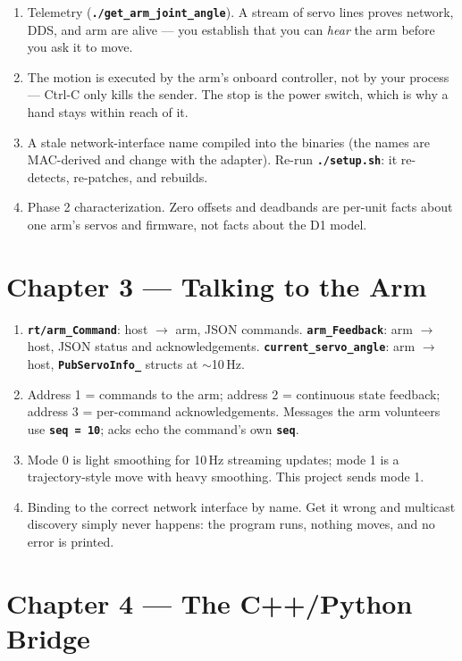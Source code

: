 \documentclass[11pt,twoside,openright]{book}
\newcommand{\code}[1]{\texttt{\bfseries #1}}
\begin{document}
\begin{enumerate}
  \item Telemetry (\code{./get\_arm\_joint\_angle}). A stream of servo
    lines proves network, DDS, and arm are alive --- you establish that
    you can \emph{hear} the arm before you ask it to move.
  \item The motion is executed by the arm's onboard controller, not by
    your process --- Ctrl-C only kills the sender. The stop is the power
    switch, which is why a hand stays within reach of it.
  \item A stale network-interface name compiled into the binaries (the
    names are MAC-derived and change with the adapter). Re-run
    \code{./setup.sh}: it re-detects, re-patches, and rebuilds.
  \item Phase 2 characterization. Zero offsets and deadbands are
    per-unit facts about one arm's servos and firmware, not facts about
    the D1 model.
\end{enumerate}

\section{Chapter 3 --- Talking to the Arm}

\begin{enumerate}
  \item \code{rt/arm\_Command}: host $\rightarrow$ arm, JSON commands.
    \code{arm\_Feedback}: arm $\rightarrow$ host, JSON status and
    acknowledgements. \code{current\_servo\_angle}: arm $\rightarrow$
    host, \code{PubServoInfo\_} structs at $\sim$10\,Hz.
  \item Address 1 = commands to the arm; address 2 = continuous state
    feedback; address 3 = per-command acknowledgements. Messages the arm
    volunteers use \code{seq = 10}; acks echo the command's own
    \code{seq}.
  \item Mode 0 is light smoothing for 10\,Hz streaming updates; mode 1
    is a trajectory-style move with heavy smoothing. This project sends
    mode 1.
  \item Binding to the correct network interface by name. Get it wrong
    and multicast discovery simply never happens: the program runs,
    nothing moves, and no error is printed.
\end{enumerate}

\section{Chapter 4 --- The C++/Python Bridge}
\end{document}
